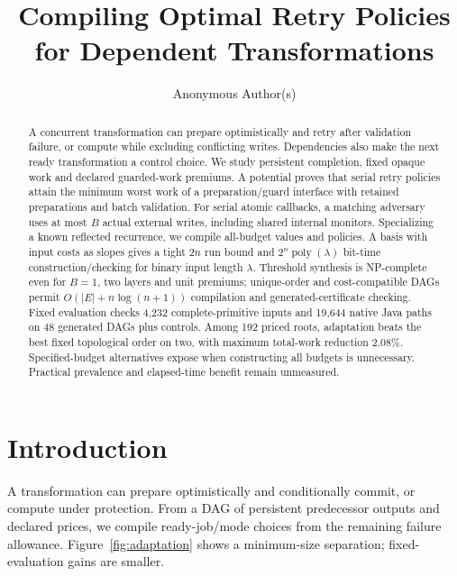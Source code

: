 \documentclass[acmsmall,screen,review,anonymous]{acmart}
\title{Compiling Optimal Retry Policies for Dependent Transformations}
\author{Anonymous Author(s)}
\begin{document}
\begin{abstract}
A concurrent transformation can prepare optimistically and retry after validation failure, or compute while excluding conflicting writes. Dependencies also make the next ready transformation a control choice. We study persistent completion, fixed opaque work and declared guarded-work premiums. A potential proves that serial retry policies attain the minimum worst work of a preparation/guard interface with retained preparations and batch validation. For serial atomic callbacks, a matching adversary uses at most $B$ actual external writes, including shared internal monitors. Specializing a known reflected recurrence, we compile all-budget values and policies. A basis with input costs as slopes gives a tight $2n$ run bound and $2^n\operatorname{poly}(\lambda)$ bit-time construction/checking for binary input length $\lambda$. Threshold synthesis is NP-complete even for $B=1$, two layers and unit premiums; unique-order and cost-compatible DAGs permit $O(|E|+n\log(n+1))$ compilation and generated-certificate checking. Fixed evaluation checks 4,232 complete-primitive inputs and 19,644 native Java paths on 48 generated DAGs plus controls. Among 192 priced roots, adaptation beats the best fixed topological order on two, with maximum total-work reduction 2.08\%. Specified-budget alternatives expose when constructing all budgets is unnecessary. Practical prevalence and elapsed-time benefit remain unmeasured.
\end{abstract}
\maketitle
\fancyfoot{}\thispagestyle{fancy}

\section{Introduction}

A transformation can prepare optimistically and conditionally commit, or compute under protection. From a DAG of persistent predecessor outputs and declared prices, we compile ready-job/mode choices from the remaining failure allowance. Figure~\ref{fig:adaptation} shows a minimum-size separation; fixed-evaluation gains are smaller.
\end{document}
